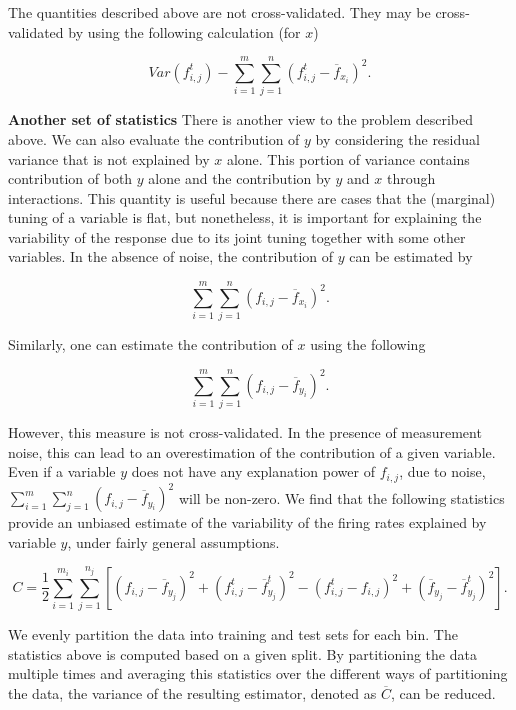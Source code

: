 \documentclass[11pt]{article}
\begin{document}
The quantities described above are not cross-validated. They may be cross-validated by using the following calculation  (for $x$)

$$
Var(f^t_{i,j})- \sum_{i=1}^m\sum_{j=1}^n (f^t_{i,j}-\overline{f}_{x_i})^2.
$$


{\bf Another set of statistics} There is another view to the problem described above. We can also evaluate the contribution of $y$ by considering the residual variance that is not explained by $x$ alone. This portion of variance contains contribution of both $y$ alone and the contribution by $y$ and $x$ through interactions.
This quantity is useful because there are cases that the (marginal) tuning of a variable is flat, but nonetheless, it is important for explaining the variability of the response due to its joint tuning together with some other variables. 
In the absence of noise, the contribution of $y$ can be estimated by  

$$
\sum_{i=1}^m\sum_{j=1}^n (f_{i,j}-\overline{f}_{x_i})^2.
$$

Similarly, one can estimate the contribution of $x$ using the following 

$$
\sum_{i=1}^m\sum_{j=1}^n (f_{i,j}-\overline{f}_{y_i})^2.
$$


However, this measure is not cross-validated. In the presence of measurement noise, this can lead to an overestimation of the contribution of a given variable. Even if a variable $y$ does not have any explanation power of $f_{i,j}$,  due to noise,$\sum_{i=1}^m\sum_{j=1}^n (f_{i,j}-\overline{f}_{y_i})^2 $ will be non-zero. 
We find that the following statistics provide an unbiased estimate of the variability of the firing rates explained by variable $y$, under fairly general assumptions. 

\begin{equation}
C
= \frac{1}{2}\sum_{i=1}^{m_i}\sum_{j=1}^{n_j} [(f_{i,j}-\overline{f}_{y_j})^2+ (f^t_{i,j}-\overline{f}^t_{y_j})^2- (f^t_{i,j} -f_{i,j})^2+ (\overline{f}_{y_j}-\overline{f}^t_{y_j})^2].
\end{equation}

We evenly partition the data into training and test sets for each bin. The statistics above is computed based on a given split. By partitioning the data multiple times and averaging this statistics over the different ways of partitioning the data, the variance of the resulting estimator, denoted as $\overline{C}$, can be reduced. 
\end{document}
